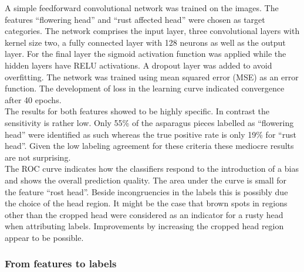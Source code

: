 A simple feedforward convolutional network was trained on the images. The features “flowering head” and “rust affected head” were chosen as target categories. The network comprises the input layer, three convolutional layers with kernel size two, a fully connected layer with 128 neurons as well as the output layer. For the final layer the sigmoid activation function was applied while the hidden layers have RELU activations. A dropout layer was added to avoid overfitting. The network was trained using mean squared error (MSE) as an error function. The development of loss in the learning curve indicated convergence after 40 epochs. \\
The results for both features showed to be highly specific. In contrast the sensitivity is rather low. Only 55\% of the asparagus pieces labelled as “flowering head” were identified as such whereas the true positive rate is only 19\% for “rust head”. Given the low labeling agreement for these criteria these mediocre results are not surprising. \\
The ROC curve indicates how the classifiers respond to the introduction of a bias and shows the overall prediction quality. The area under the curve is small for the feature “rost head”. Beside incongruencies in the labels this is possibly due the choice of the head region. It might be the case that brown spots in regions other than the cropped head were considered as an indicator for a rusty head when attributing labels. Improvements by increasing the cropped head region appear to be possible. \\


\subsubsection{From features to labels}
\label{subsec:FeaturesToLabels}

